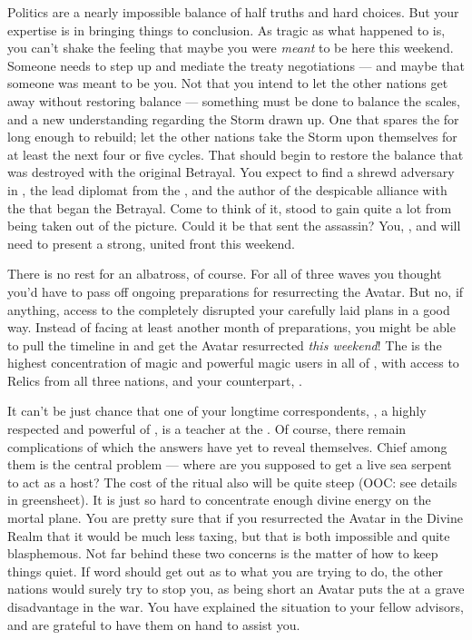 \documentclass[char]{GL2020}
\begin{document}
Politics are a nearly impossible balance of half truths and hard choices. But your expertise is in bringing things to conclusion. As tragic as what happened to \cHeadDiplomat{} is, you can't shake the feeling that maybe you were \emph{meant} to be here this weekend. Someone needs to step up and mediate the treaty negotiations — and maybe that someone was meant to be you. Not that you intend to let the other nations get away without restoring balance — something must be done to balance the scales, and a new understanding regarding the Storm drawn up. One that spares the \pShip{} for long enough to rebuild; let the other nations take the Storm upon themselves for at least the next four or five cycles. That should begin to restore the balance that was destroyed with the original Betrayal. You expect to find a shrewd adversary in \cDiplomat{\full}, the lead diplomat from the \pTech{}, and the author of the despicable alliance with the \pFarm{} that began the Betrayal. Come to think of it, \cDiplomat{} stood to gain quite a lot from \cHeadDiplomat{} being taken out of the picture. Could it be that \cDiplomat{\they} sent the assassin? You, \cJuniorStatesman{}, and \cChupLeader{} will need to present a strong, united front this weekend.

There is no rest for an albatross, of course. For all of three waves you thought you’d have to pass off ongoing preparations for resurrecting the \cEbb{} Avatar. But no, if anything, access to the \pSchool{} completely disrupted your carefully laid plans in a good way. Instead of facing at least another month of preparations, you might be able to pull the timeline in and get the Avatar resurrected \emph{this weekend}! The \pSc{} is the highest concentration of magic and powerful magic users in all of \pEarth{}, with access to Relics from all three nations, and your counterpart, \cFlowPriest{\full}.

It can't be just chance that one of your longtime correspondents, \cFlowPriest{}, a highly respected and powerful \cFlowPriest{\cleric} of \cFlowFull{\full}, is a teacher at the \pSchool{}. Of course, there remain complications of which the answers have yet to reveal themselves. Chief among them is the central problem — where are you supposed to get a live sea serpent to act as a host? The cost of the ritual also will be quite steep (OOC: see details in greensheet). It is just so hard to concentrate enough divine energy on the mortal plane. You are pretty sure that if you resurrected the Avatar in the Divine Realm that it would be much less taxing, but that is both impossible and quite blasphemous. Not far behind these two concerns is the matter of how to keep things quiet. If word should get out as to what you are trying to do, the other nations would surely try to stop you, as being short an Avatar puts the \pShippies{} at a grave disadvantage in the war. You have explained the situation to your fellow \pShip{} advisors, and are grateful to have them on hand to assist you.
\end{document}
